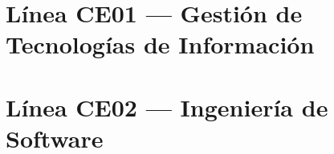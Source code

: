 \documentclass[12pt,a4paper]{report}
\begin{document}



\tableofcontents
\listoftables
\listoffigures

\clearpage
{}




\part{Línea CE01 — Gestión de Tecnologías de Información}

\part{Línea CE02 — Ingeniería de Software}

\end{document}
